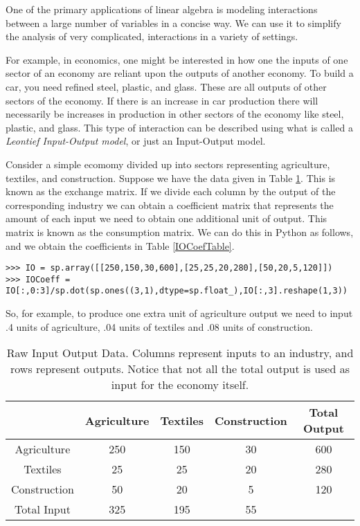 \label{Leontief}


One of the primary applications of linear algebra is modeling interactions between a large number of variables in a concise way.
We can use it to simplify the analysis of very complicated, interactions in a variety of settings.

For example, in economics, one might be interested in how one the inputs of one sector of an economy are reliant upon the outputs of another economy.
To build a car, you need refined steel, plastic, and glass.
These are all outputs of other sectors of the economy.
If there is an increase in car production there will necessarily be increases in production in other sectors of the economy like steel, plastic, and glass.
This type of interaction can be described using what is called a \emph{Leontief Input-Output model}, or just an Input-Output model.

Consider a simple ecomomy divided up into sectors representing agriculture, textiles, and construction.
Suppose we have the data given in Table \ref{IORawTable}.
This is known as the exchange matrix.
If we divide each column by the output of the corresponding industry we can obtain a coefficient matrix that represents the amount of each input we need to obtain one additional unit of output.
This matrix is known as the consumption matrix.
We can do this in Python as follows, and we obtain the coefficients in Table \ref{IOCoefTable}.

\begin{lstlisting}
>>> IO = sp.array([[250,150,30,600],[25,25,20,280],[50,20,5,120]])
>>> IOCoeff = IO[:,0:3]/sp.dot(sp.ones((3,1),dtype=sp.float_),IO[:,3].reshape(1,3))
\end{lstlisting}
So, for example, to produce one extra unit of agriculture output we need to input .4 units of agriculture, .04 units of textiles and .08 units of construction.

\begin{table}
\begin{center}
\begin{tabular}{|c|c|c|c|c|}
\hline
& Agriculture & Textiles & Construction & Total Output \\ \hline
Agriculture & 250 & 150 & 30 & 600 \\ \hline
Textiles & 25 & 25 & 20 & 280 \\ \hline
Construction & 50 & 20 & 5 & 120 \\ \hline
Total Input & 325 & 195 & 55 & \\ \hline
\end{tabular}
\caption{Raw Input Output Data.
Columns represent inputs to an industry, and rows represent outputs.
Notice that not all the total output is used as input for the economy itself.}
\label{IORawTable}
\end{center}
\end{table}

